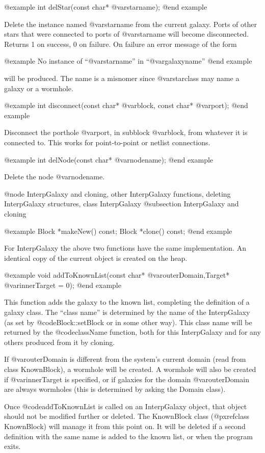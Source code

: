 @example
int delStar(const char* @var{starname});
@end example

Delete the instance named @var{starname} from the current galaxy.
Ports of other stars that were connected to ports of @var{starname}
will become disconnected.  Returns 1 on success, 0 on failure.  On
failure an error message of the form

@example
No instance of ``@var{starname}'' in ``@var{galaxyname}''
@end example

will be produced.  The name is a misnomer since @var{starclass} may
name a galaxy or a wormhole.

@example
int disconnect(const char* @var{block}, const char* @var{port});
@end example

Disconnect the porthole @var{port}, in subblock @var{block}, from
whatever it is connected to.  This works for point-to-point or netlist
connections.

@example
int delNode(const char* @var{nodename});
@end example

Delete the node @var{nodename}.

@node InterpGalaxy and cloning, other InterpGalaxy functions, deleting InterpGalaxy structures, class InterpGalaxy
@subsection InterpGalaxy and cloning

@example
Block *makeNew() const;
Block *clone() const;
@end example

For InterpGalaxy the above two functions have the same implementation.
An identical copy of the current object is created on the heap.

@example
void addToKnownList(const char* @var{outerDomain},Target* @var{innerTarget} = 0);
@end example

This function adds the galaxy to the known list, completing the
definition of a galaxy class.  The ``class name'' is determined by
the name of the InterpGalaxy (as set by @code{Block::setBlock} or
in some other way).  This class name will be returned by the
@code{className} function, both for this InterpGalaxy and for any
others produced from it by cloning.

If @var{outerDomain} is different from the system's current domain (read
from class KnownBlock), a wormhole will be created.  A wormhole will
also be created if @var{innerTarget} is specified, or if galaxies for
the domain @var{outerDomain} are always wormholes (this is determined by
asking the Domain class).

Once @code{addToKnownList} is called on an InterpGalaxy object,
that object should not be modified further or deleted.  The KnownBlock
class (@pxref{class KnownBlock})
will manage it from this point on.  It will be deleted if a second
definition with the same name is added to the known list, or when the
program exits.



